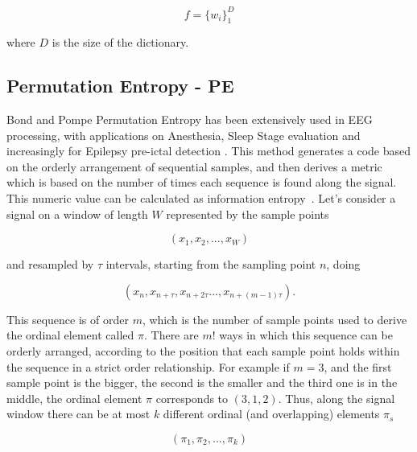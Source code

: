 \documentclass[brainsci,article,submit,moreauthors,pdftex,10pt,a4paper]{mdpi}
\begin{document}
\begin{equation}
f =  {\bigg \{ w_{i} \bigg \}}_{1}^{D} 
\label{eq:mp6}
\end{equation}

\noindent where $D$ is the size of the dictionary.  



\subsection{Permutation Entropy - PE}

Bond and Pompe Permutation Entropy has been extensively used in EEG processing, with applications on Anesthesia, Sleep Stage evaluation and increasingly for Epilepsy pre-ictal detection \citep{Bandt2002}.  This method generates a code based on the orderly arrangement of sequential samples, and then derives a metric which is based on the number of times each sequence is found along the signal.  This numeric value can be calculated as information entropy~\citep{Nicolaou2010}. Let's consider a signal on a window of length $W$ represented by the sample points

\begin{equation}
(x_1,x_2,...,x_{W})
\label{eq:pesignal}
\end{equation}

\noindent and resampled by $\tau$ intervals, starting from the sampling point $n$, doing

\begin{equation}
(x_n,x_{n+\tau},x_{n+2 \tau}...,x_{n+(m-1)\tau}).
\label{eq:pe2}
\end{equation}

This sequence is of order $m$, which is the number of sample points used to derive the ordinal element called $\pi$. There are $m!$ ways in which this sequence can be orderly arranged, according to the position that each sample point holds within the sequence in a strict order relationship.  For example if $m=3$, and the first sample point is the bigger, the second is the smaller and the third one is in the middle, the ordinal element $\pi$ corresponds to $(3,1,2)$. Thus, along the signal window there can be at most $k$ different ordinal (and overlapping) elements $\pi_{s}$

\begin{equation}
(\pi_{1},\pi_{2},...,\pi_{k})
\label{eq:pe3}
\end{equation}
\end{document}
